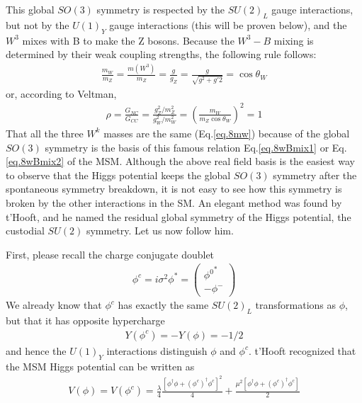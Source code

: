 \documentclass[12pt]{article}
\begin{document}
  This global $SO(3)$ symmetry is respected by the $SU(2)_L$ gauge
  interactions, but not by the $U(1)_Y$ gauge interactions
  (this will be proven below), and the $W^3$ mixes with B to make
  the Z bosons.  Because the $W^3-B$ mixing is determined by their
  weak coupling strengths, the following rule follows:
\begin{eqnarray}
  \frac{m_W}{m_Z}=\frac{m(W^3)}{m_Z}=\frac{g}{g_Z}=\frac{g}{\sqrt{g^2+g'2}} =\cos\theta_W \label{eq.8wBmix1}
\end{eqnarray}
  or, according to Veltman,
\begin{eqnarray}
  \rho = \frac{G_{NC}}{G_{CC}}=\frac{g_Z^2/m_Z^2}{g_W^2/m_W^2}=\left( \frac{m_W}{m_Z\cos\theta_W}\right)^2=1 \label{eq.8wBmix2}
\end{eqnarray}
  That all the three $W^k$ masses are the same (Eq.\ref{eq.8mw}) because of the global $SO(3)$ symmetry is the basis of this famous relation Eq.\ref{eq.8wBmix1} or Eq.\ref{eq.8wBmix2} of the MSM.  Although the above real field basis is the easiest way to observe that the Higgs potential keeps the global $SO(3)$ symmetry after the spontaneous symmetry breakdown, it is not easy to see how this symmetry is broken by the other interactions in the SM.
  An elegant method was found by t'Hooft, and he named the residual
  global symmetry of the Higgs potential, the custodial $SU(2)$ symmetry.
  Let us now follow him.

  First, please recall the charge conjugate doublet
  \begin{eqnarray}
    \phi^c = i \sigma^2 \phi^* =
    \begin{pmatrix}
      {\phi^0}^* \\ -\phi^-
    \end{pmatrix}
  \end{eqnarray}
  We already know that $\phi^c$ has exactly the same $SU(2)_L$
  transformations as $\phi$, but that it has opposite hypercharge
  \begin{eqnarray}
    Y(\phi^c) = -Y(\phi) = -1/2
  \end{eqnarray}
  and hence the $U(1)_Y$ interactions distinguish $\phi$ and $\phi^c$.
  t'Hooft recognized that the MSM Higgs potential can be written as
  \begin{eqnarray}
    V(\phi)
    = V(\phi^c)
    = \frac{\lambda}{4} \frac{[\phi^\dagger \phi + (\phi^c)^\dagger \phi^c]^2}{4}
         +\frac{\mu^2 [\phi^\dagger \phi + (\phi^c)^\dagger \phi^c]}{2} \label{eq8.V2}
  \end{eqnarray}
\end{document}
